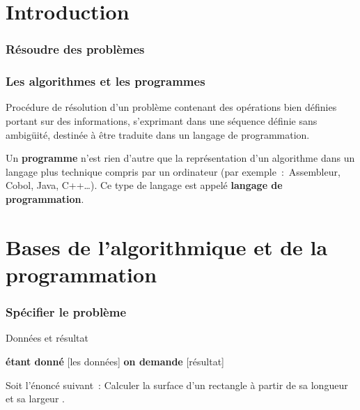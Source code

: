 \begin{hideedit}

\part{Introduction}
\frame{\partpage}
\section{Résoudre des problèmes}
\frame{\sectionpage}
\section{Les algorithmes et les programmes}
\frame{\sectionpage}
\begin{frame}
  \begin{definition}[Algorithme]
    Procédure de résolution d’un problème
    contenant des opérations bien définies
    portant sur des informations,
    s’exprimant dans une séquence définie sans ambigüité,
    destinée à être traduite dans un langage de programmation.
  \end{definition}
  \begin{definition}[Programme]
    Un \textbf{programme} n’est rien d’autre
    que la représentation d’un algorithme
    dans un langage plus technique compris par un ordinateur
    (par exemple~:~Assembleur, Cobol, Java, C++\dots).
    Ce type de langage est appelé
    \textbf{langage de programmation}.
  \end{definition}
\end{frame}

\part{Bases de l'algorithmique et de la programmation}
\frame{\partpage}

\section{Spécifier le problème}
\frame{\sectionpage}
\begin{frame}{Données et résultat}
  \begin{block}{}
  \begin{center}
    {\textbf{étant donné} [les données]
    \textbf{on demande} [résultat]}
  \end{center}
  \end{block}
  \pause
  \begin{example}
    Soit l’énoncé suivant~:
    \og
      Calculer la surface d’un rectangle
      à partir de sa longueur et sa largeur
    \fg.


\end{example}
\end{frame}
\end{hideedit}
